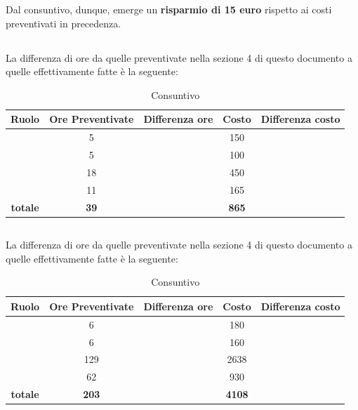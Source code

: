 Dal consuntivo, dunque, emerge un \textbf{risparmio di 15 euro} rispetto ai costi preventivati in precedenza.

\newpage

\subsection{\ARD}
La differenza di ore da quelle preventivate nella sezione 4 di questo documento a quelle effettivamente fatte è la seguente:

\begin{table}[h]
	\begin{center}
		\begin{tabular}{|c|c|c|c|c|}
			\hline
			\textbf{Ruolo}	& \textbf{Ore Preventivate} & \textbf{Differenza ore} & \textbf{Costo} & \textbf{Differenza costo}\\
			\hline
			\Pm &	5  & &	150 &	\\
			\hline
			\Am	&	5 &	& 100 & \\
			\hline
			\An	&	18 & & 450 & \\
			\hline
			\Ver &	11 & & 165 & \\
			\hline
			\textbf{totale}	&	\textbf{39} & & \textbf{865} & \\
			\hline
		\end{tabular}
	\end{center}
	\caption{Consuntivo \ARD}
\end{table}

\newpage

\subsection{\PA}
La differenza di ore da quelle preventivate nella sezione 4 di questo documento a quelle effettivamente fatte è la seguente:

\begin{table}[h]
	\begin{center}
		\begin{tabular}{|c|c|c|c|c|}
			\hline
			\textbf{Ruolo}	& \textbf{Ore Preventivate} & \textbf{Differenza ore} & \textbf{Costo} & \textbf{Differenza costo}\\
			\hline
			\Pm &	6  & &	180 &	\\
			\hline
			\Am	&	6 &	& 160 & \\
			\hline
			\Prog	&	129 & & 2638 & \\
			\hline
			\Ver &	62 & & 930 & \\
			\hline
			\textbf{totale}	&	\textbf{203} & & \textbf{4108} & \\
			\hline
		\end{tabular}
	\end{center}
	\caption{Consuntivo \PA}
\end{table}


